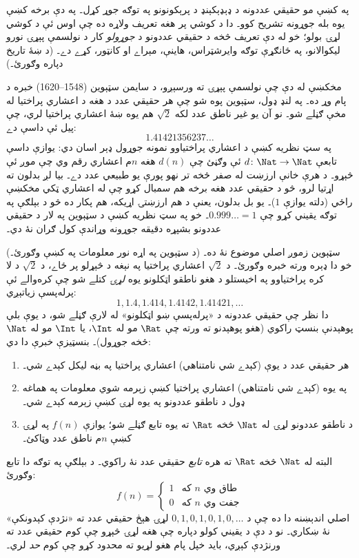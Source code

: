 \documentclass[../../../include/open-logic-section]{subfiles}
\begin{document}


په  کښې مو حقيقي عددونه د ډېډېکېنډ د پرېکونونو په
توګه جوړ کړل۔ په دې برخه کښې يوه بله جوړونه تشريح کوو۔ دا د کوشي پر
هغه تعريف ولاړه ده چې اوس ئې د کوشي لړۍ بولو؛ خو له دې تعريف څخه د
حقيقي عددونو د \emph{جوړولو} کار د نولسمې پېړۍ نورو ليکوالانو، په
ځانګړې توګه وايرشټراس، هاينې، مېراے او کانټور، کړے دے۔ (د ښۀ تاريخ
دپاره \citeauthor{OConnorRobertson:RN} \citeyear{OConnorRobertson:RN}
وګورئ۔)

مخکښې له دې چې نولسمې پېړۍ ته ورسېږو، د سايمن سټېوين (1548--1620)
خبره د پام وړ ده۔ په لنډ ډول، سټېوين پوه شو چې هر حقيقي عدد د هغه د
اعشاري پراختيا له مخې ګڼلے شو۔ نو آن يو غير ناطق عدد لکه $\sqrt{2}$
هم يوه ښۀ اعشاري پراختيا لري، چې پيل ئې داسې دے:
\[
	1.41421356237\ldots
\]
په سټ نظريه کښې د اعشاري پراختياوو نمونه جوړول ډېر اسان دي: يوازې
داسې تابعې $d \colon \Nat \to \Nat$ ئې وګڼئ چې $d(n)$ هغه $n$م
اعشاري رقم وي چې موږ ئې څېړو۔ د هرې خانې ارزښت له صفر څخه تر
نهو پورې يو طبيعي عدد دے۔ بيا لږ بدلون ته اړتيا لرو، څو د حقيقي
عدد هغه برخه هم سمبال کړو چې له اعشاري ټکي مخکښې راځي (دلته يوازې
$1$)۔ يو بل بدلون، يعنې د هم ارزښتۍ اړيکه، هم پکار ده څو د بېلګې په
توګه يقيني کړو چې $0.999\ldots = 1$۔ خو په سټ نظريه کښې د سټېوين په
لار د حقيقي عددونو بشپړه دقيقه جوړونه وړاندې کول ګران نۀ دي۔

سټېوين زموږ اصلي موضوع نۀ ده۔ (د سټېوين په اړه نور معلومات په
\citealt{KatzKatz2012} کښې وګورئ۔) خو دا ډېره ورته خبره وګورئ۔ د
$\sqrt{2}$ اعشاري پراختيا په نېغه د څېړلو پر ځاے، د $\sqrt{2}$ د
لا کره پراختياوو په اخيستلو د هغو ناطقو اټکلونو يوه \emph{لړۍ}
کتلے شو چې کره‌والے ئې پرله‌پسې زياتېږي:
\[
1, 1.4, 1.414, 1.4142, 1.41421,\ldots
\]
دا نظر چې حقيقي عددونه د «پرله‌پسې ښو اټکلونو» له لارې ګڼلے شو، د
يوې بلې پوهېدنې بنسټ راکوي (هغو پوهېدنو ته ورته چې $\Rat$ مو له
$\Int$، يا $\Int$ مو له $\Nat$ څخه جوړول)۔ بنسټيزې خبرې دا دي:
\begin{enumerate}
	\item هر حقيقي عدد د يوې (کېدے شي نامتناهي) اعشاري پراختيا په
	بڼه ليکل کېدے شي۔
	\item په يوه (کېدے شي نامتناهي) اعشاري پراختيا کښې زېرمه شوي
	معلومات په هماغه ډول د ناطقو عددونو په يوه لړۍ کښې زېرمه کېدے شي۔
	\item د ناطقو عددونو لړۍ له $\Nat$ څخه $\Rat$ ته يوه تابع ګڼلے
	شو؛ يوازې $f(n)$ په لړۍ کښې $n$م ناطق عدد وټاکئ۔
\end{enumerate}
البته له $\Nat$ څخه $\Rat$ ته هره \emph{تابع} حقيقي عدد نۀ راکوي۔
د بېلګې په توګه دا تابع وګورئ:
\[
	f(n) =\begin{cases}
			1 & \text{که }n\text{ طاق وي}\\
			0 &\text{که }n\text{ جفت وي}
		\end{cases}
\]
اصلي اندېښنه دا ده چې د $0,1,0,1,0,1,0,\ldots$ لړۍ هېڅ حقيقي
عدد ته «نژدې کېدونکې» نۀ ښکاري۔ نو د دې د يقيني کولو دپاره چې هغه
لړۍ څېړو چې کوم حقيقي عدد ته ورنژدې کېږي، بايد خپل پام هغو لړيو ته
محدود کړو چې کوم \emph{حد} لري۔
\end{document}
